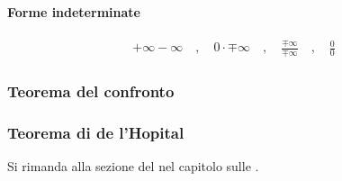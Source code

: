 \documentclass[letterpaper,10pt,english]{jupyterBook}
\begin{document}
\paragraph{Forme indeterminate}
\label{\detokenize{ch/infinitesimal_calculus/limits:forme-indeterminate}}\begin{equation*}
\begin{split}+\infty-\infty \quad , \quad 0 \cdot \mp \infty \quad , \quad \frac{\mp \infty}{\mp \infty} \quad , \quad \frac{0}{0}\end{split}
\end{equation*}

\subsubsection{Teorema del confronto}
\label{\detokenize{ch/infinitesimal_calculus/limits:teorema-del-confronto}}

\subsubsection{Teorema di de l’Hopital}
\label{\detokenize{ch/infinitesimal_calculus/limits:teorema-di-de-l-hopital}}
\sphinxAtStartPar
{} Si rimanda alla sezione del {\hyperref[\detokenize{ch/infinitesimal_calculus/derivatives:infinitesimal-calculus-derivatives-thm-hopital}]{}} nel capitolo sulle {\hyperref[\detokenize{ch/infinitesimal_calculus/derivatives:infinitesimal-calculus-derivatives}]{}}.
\end{document}
